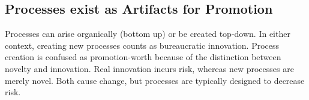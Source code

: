 \subsection*{Processes exist as Artifacts for Promotion}

Processes can arise organically (bottom up) or be created top-down. In either context, creating new processes counts as bureaucratic innovation. Process creation is confused as promotion-worth because of the distinction between novelty and innovation. Real innovation incurs risk, whereas new processes are merely novel. Both cause change, but processes are typically designed to decrease risk. 

